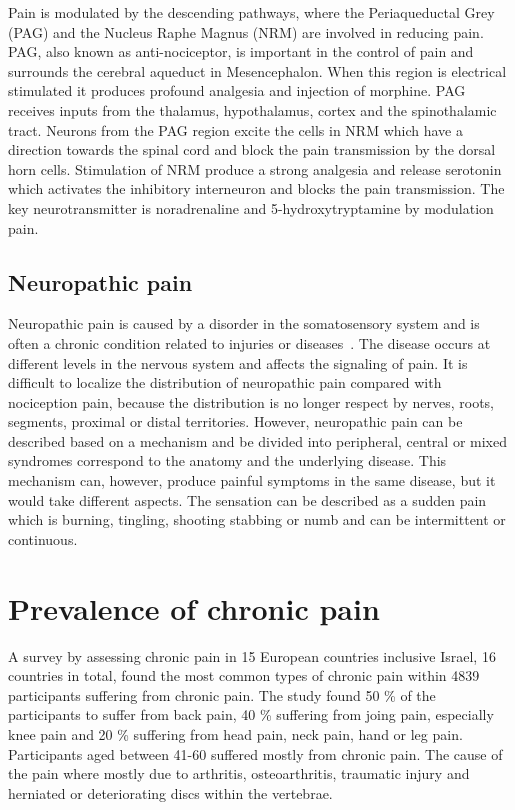 Pain is modulated by the descending pathways, where the Periaqueductal Grey (PAG) and the Nucleus Raphe Magnus (NRM) are involved in reducing pain. PAG, also known as anti-nociceptor, is important in the control of pain and surrounds the cerebral aqueduct in Mesencephalon. When this region is electrical stimulated it produces profound analgesia and injection of morphine. PAG receives inputs from the thalamus, hypothalamus, cortex and the spinothalamic tract. Neurons from the PAG region excite the cells in NRM which have a direction towards the spinal cord and block the pain transmission by the dorsal horn cells. Stimulation of NRM produce a strong analgesia and release serotonin which activates the inhibitory interneuron and blocks the pain transmission. The key neurotransmitter is noradrenaline and 5-hydroxytryptamine by modulation pain.~\cite{Steeds2013}


\subsection{Neuropathic pain}
Neuropathic pain is caused by a disorder in the somatosensory system and is often a chronic condition related to injuries or diseases~\cite{Mindruta2013}. The disease occurs at different levels in the nervous system and affects the signaling of pain. It is difficult to localize the distribution of neuropathic pain compared with nociception pain, because the distribution is no longer respect by nerves, roots, segments, proximal or distal territories. However, neuropathic pain can be described based on a mechanism and be divided into peripheral, central or mixed syndromes correspond to the anatomy and the underlying disease. This mechanism can, however, produce painful symptoms in the same disease, but it would take different aspects. The sensation can be described as a sudden pain which is burning, tingling, shooting stabbing or numb and can be intermittent or continuous.

\section{Prevalence of chronic pain}
A survey  by \cite{Breivik2006} assessing chronic pain in 15 European countries inclusive Israel, 16 countries in total, found the most common types of chronic pain within 4839 participants suffering from chronic pain. The study found 50 \% of the participants to suffer from back pain, 40 \% suffering from joing pain, especially knee pain and 20 \% suffering from head pain, neck pain, hand or leg pain. Participants aged between 41-60 suffered mostly from chronic pain. The cause of the pain where mostly due to arthritis, osteoarthritis, traumatic injury and herniated or deteriorating discs within the vertebrae. \cite{Breivik2006}

